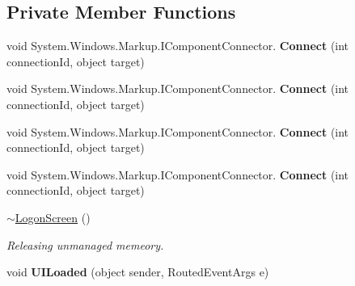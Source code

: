 \subsection*{Private Member Functions}
\begin{DoxyCompactItemize}
\item 
\mbox{\label{class_wpf_handler_1_1_u_i_1_1_controls_1_1_logon_1_1_logon_screen_a823deb2cd00da3e7fd7ae170c54f5d83}} 
void System.\+Windows.\+Markup.\+I\+Component\+Connector. {\bfseries Connect} (int connection\+Id, object target)
\item 
\mbox{\label{class_wpf_handler_1_1_u_i_1_1_controls_1_1_logon_1_1_logon_screen_a823deb2cd00da3e7fd7ae170c54f5d83}} 
void System.\+Windows.\+Markup.\+I\+Component\+Connector. {\bfseries Connect} (int connection\+Id, object target)
\item 
\mbox{\label{class_wpf_handler_1_1_u_i_1_1_controls_1_1_logon_1_1_logon_screen_a823deb2cd00da3e7fd7ae170c54f5d83}} 
void System.\+Windows.\+Markup.\+I\+Component\+Connector. {\bfseries Connect} (int connection\+Id, object target)
\item 
\mbox{\label{class_wpf_handler_1_1_u_i_1_1_controls_1_1_logon_1_1_logon_screen_a823deb2cd00da3e7fd7ae170c54f5d83}} 
void System.\+Windows.\+Markup.\+I\+Component\+Connector. {\bfseries Connect} (int connection\+Id, object target)
\item 
\mbox{\hyperlink{class_wpf_handler_1_1_u_i_1_1_controls_1_1_logon_1_1_logon_screen_a76ac98ecd8837969899dd869fd3014fe}{$\sim$\+Logon\+Screen}} ()
\begin{DoxyCompactList}\small\item\em Releasing unmanaged memeory. \end{DoxyCompactList}\item 
\mbox{\label{class_wpf_handler_1_1_u_i_1_1_controls_1_1_logon_1_1_logon_screen_aac956fb8efae7493cbc6f554f4716b66}} 
void {\bfseries U\+I\+Loaded} (object sender, Routed\+Event\+Args e)
\item 

\end{DoxyCompactItemize}
